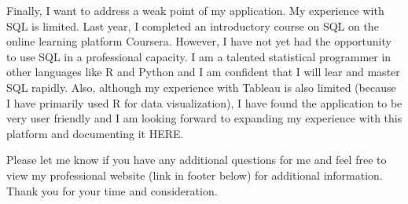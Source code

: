 \documentclass[11pt,a4paper,sans]{moderncv}
\begin{document}
	Finally, I want to address a weak point of my application. My experience with SQL is limited. Last year, I completed an introductory course on SQL on the online learning platform Coursera. However, I have not yet had the opportunity to use SQL in a professional capacity. I am a talented statistical programmer in other languages like R and Python and I am confident that I will lear and master SQL rapidly. Also, although my experience with Tableau is also limited (because I have primarily used R for data visualization), I have found the application to be very user friendly and I am looking forward to expanding my experience with this platform and documenting it HERE. 
	
	
	Please let me know if you have any additional questions for me and feel free to view my professional website (link in footer below) for additional information. Thank you for your time and consideration.\\
	
	\vspace{3mm}
	
	\makeletterclosing
	
\end{document}
